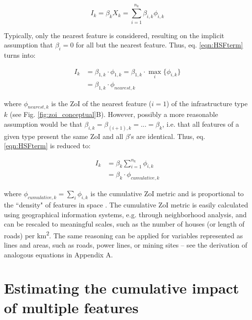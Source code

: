 \documentclass[titlepage]{article}
\begin{document}
\begin{equation}
\label{eqn:HSFterm}
    I_k = \beta_k X_k = \sum_{i=1}^{n_k} \beta_{i,k} \phi_{i,k}
\end{equation}

Typically, only the nearest feature is considered, resulting on the implicit assumption that $\beta_i = 0$ for all but the nearest feature. Thus, eq. \ref{eqn:HSFterm} turns into:

\begin{equation}
\label{eqn:HSFnearest}
\begin{split}
    I_k & = \beta_{1,k} \cdot \phi_{1,k} = \beta_{1,k} \cdot \max_{i}\{\phi_{i,k}\} \\
        & = \beta_{1,k} \cdot \phi_{nearest,k} 
\end{split}                
\end{equation}

where $\phi_{nearest,k}$ is the ZoI of the nearest feature ($i = 1$) of the infrastructure type $k$ (see Fig. \ref{fig:zoi_conceptual}B). However, possibly a more reasonable assumption would be that $\beta_{i,k} = \beta_{{(i+1)},k} = ... = \beta_k$, i.e. that all features of a given type present the same ZoI and all $\beta$'s are identical. Thus, eq. \ref{eqn:HSFterm} is reduced to:

\begin{equation}
\label{eqn:HSFcuminf}
\begin{split}
    I_k & = \beta_k \sum_{i=1}^{n_k} \phi_{i,k} \\
        & = \beta_k \cdot \phi_{cumulative,k}
\end{split}
\end{equation}

where $\phi_{cumulative,k} = \sum_{i} \phi_{i,k}$ is the cumulative ZoI metric and is proportional to 
the ``density" of features in space \citep[e.g.][]{panzacchi_searching_2015}. The cumulative ZoI metric is easily calculated using geographical information systems, e.g. through neighborhood analysis, and can be rescaled to meaningful scales, such as the number of houses (or length of roads) per km\textsuperscript{2}. The same reasoning can be applied for variables represented as lines and areas, such as roads, power lines, or mining sites -- see the derivation of analogous equations in Appendix A.

\section{Estimating the cumulative impact of multiple features}
\end{document}
